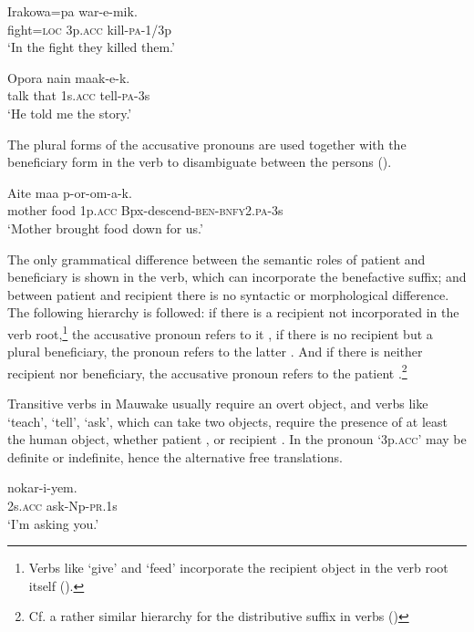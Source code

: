 \ea%
\label{ex:3:x548}
\gll Irakowa=pa  war-e-mik. \\
fight=\textsc{loc} 3p.\textsc{acc} kill-\textsc{pa}-1/3p\\
\glt`In the fight they killed them.'
\z

\ea%
\label{ex:3:x550}
\gll Opora nain  maak-e-k. \\
talk that 1s.\textsc{acc} tell-\textsc{pa}-3s\\
\glt`He told me the story.' 
\z

The plural forms of the accusative pronouns are used together with the beneficiary form in the verb to disambiguate between the persons  ().

\ea%
\label{ex:3:x549}
\gll Aite maa  p-or-om-a-k. \\
mother food 1p.\textsc{acc} Bpx-descend-\textsc{ben}-\textsc{bnfy}2.\textsc{pa}-3s\\
\glt`Mother brought food down for us.'
\z

The only grammatical difference between the semantic roles of patient and beneficiary is shown in the verb, which can incorporate the benefactive suffix; and between patient and recipient there is no syntactic or morphological difference. The following hierarchy is followed: if there is a recipient not incorporated in the verb root,\footnote{Verbs like `give' and `feed' incorporate the recipient object in the verb root itself ().} the accusative pronoun refers to it , if there is no recipient but a plural beneficiary, the pronoun refers to the latter . And if there is neither recipient nor beneficiary, the accusative pronoun refers to the patient .\footnote{Cf. a rather similar hierarchy for the distributive suffix in verbs ()} 

Transitive verbs in Mauwake usually require an overt object, and verbs like `teach', `tell', `ask', which can take two objects, require the presence of at least the human object, whether patient , or recipient . In  the pronoun  `3p.\textsc{acc}' may be definite or indefinite, hence the alternative free translations.

\ea%
\label{ex:3:x552}
\gll {} nokar-i-yem. \\
2s.\textsc{acc} ask-Np-\textsc{pr}.1s\\
\glt`I'm asking you.'
\z

